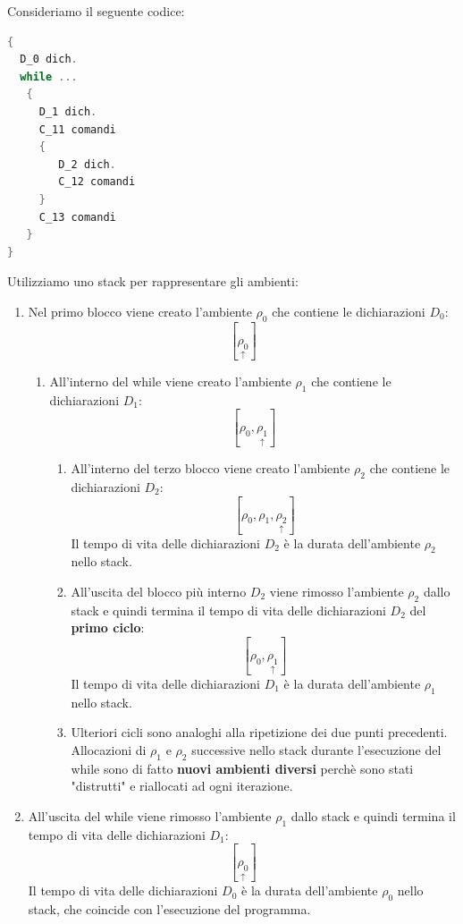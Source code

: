 \documentclass[a4paper]{article}
\begin{document}
\begin{example}
  Consideriamo il seguente codice:
\begin{lstlisting}[language=C]
{
  D_0 dich.
  while ...
   {
     D_1 dich.
     C_11 comandi
     {
        D_2 dich.
        C_12 comandi
     }
     C_13 comandi
   }
}
\end{lstlisting}
  Utilizziamo uno stack per rappresentare gli ambienti:
  \begin{enumerate}
    \item Nel primo blocco viene creato l'ambiente \( \rho_0 \) che contiene le
      dichiarazioni \( D_0 \):
      \[
        [\underset{\uparrow}{\rho_0}]
      \] 
      \begin{enumerate}
        \item All'interno del while viene creato l'ambiente \( \rho_1 \) che contiene le
          dichiarazioni \( D_1 \):
          \[
            [\rho_0, \underset{\uparrow}{\rho_1}]
          \]

          \begin{enumerate}
            \item All'interno del terzo blocco viene creato l'ambiente \( \rho_2 \) che contiene
              le dichiarazioni \( D_2 \):
              \[
                [\rho_0, \rho_1, \underset{\uparrow}{\rho_2}]
              \]
              Il tempo di vita delle dichiarazioni \( D_2 \) è la durata dell'ambiente
              \( \rho_2 \) nello stack.

            \item All'uscita del blocco più interno \( D_2 \) viene rimosso l'ambiente
              \( \rho_2 \) dallo stack e quindi termina il tempo di vita delle dichiarazioni
              \( D_2 \) del \textbf{primo ciclo}:
              \[
                [\rho_0, \underset{\uparrow}{\rho_1}]
              \]
              Il tempo di vita delle dichiarazioni \( D_1 \) è la durata dell'ambiente
              \( \rho_1 \) nello stack.

            \item Ulteriori cicli sono analoghi alla ripetizione dei due punti precedenti.
              Allocazioni di \( \rho_1 \) e \( \rho_2 \) successive nello stack durante
              l'esecuzione del while sono di fatto \textbf{nuovi ambienti diversi}
              perchè sono stati "distrutti" e riallocati ad ogni iterazione.
          \end{enumerate}
      \end{enumerate}

    \item All'uscita del while viene rimosso l'ambiente \( \rho_1 \) dallo stack e quindi
      termina il tempo di vita delle dichiarazioni \( D_1 \):
      \[
        [\underset{\uparrow}{\rho_0}]
      \]
      Il tempo di vita delle dichiarazioni \( D_0 \) è la durata dell'ambiente
      \( \rho_0 \) nello stack, che coincide con l'esecuzione del programma.
  \end{enumerate}
\end{example}
\end{document}

